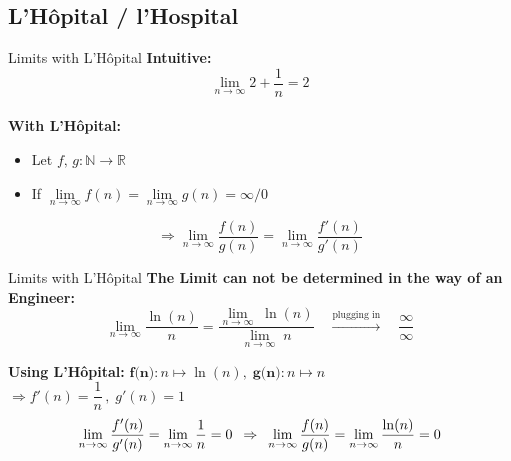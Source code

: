 \subsection{L'H\^{o}pital / l'Hospital}

\begin{frame}{Limits with L'H\^{o}pital}
  \textbf{Intuitive:}\\
  \[\lim\limits_{n \rightarrow \infty} 2 + \dfrac{1}{n} = 2\]
  \vspace*{1.0em}\\
  \textbf{With L'H\^{o}pital:}
  \begin{itemize}
    \item
      Let $f, \, g : \mathbb{N} \rightarrow \mathbb{R}$
    \item
      If
      $\lim\limits_{n \to \infty} f(n)
        = \lim\limits_{n \to \infty} g(n)
        = \infty / 0$
  \end{itemize}
  \[
    \Rightarrow \lim\limits_{n \rightarrow \infty} \dfrac{f(n)}{g(n)} = 
    \lim\limits_{n \rightarrow \infty} \dfrac{f'(n)}{g'(n)}
  \]
\end{frame}


\begin{frame}{Limits with L'H\^{o}pital}
  \textbf{The Limit can not be determined in the way of an Engineer:}\\
  \[
    \lim_{n \to \infty} \dfrac{\ln (n)}{n}
      = \dfrac{\lim_{n \to \infty}\; \ln (n)}{\lim\limits_{n \to \infty}\; n}
    \hspace{1em} \stackrel{\text{plugging in}}{\longrightarrow} \hspace{1em}
      \dfrac{\infty}{\infty}
  \]
  \begin{block}{\textbf{Using L'H\^{o}pital:}}
    $\textbf{f(n)}\!: n \mapsto \ln (n), \; \textbf{g(n)}\!: n \mapsto n$\\
    \hspace{1.5em}
    $\Rightarrow f'(n) = \dfrac{1}{n} \, , \; g'(n) = 1$
    \[
      \lim\limits_{n \rightarrow \infty} \dfrac{f'(n)}{g'(n)}
        = \lim\limits_{n \rightarrow \infty} \dfrac{1}{n} = 0
      \hspace{0.5em} \Rightarrow \hspace{0.5em}
      \lim\limits_{n \rightarrow \infty} \dfrac{f(n)}{g(n)}
        = \lim\limits_{n \rightarrow \infty} \dfrac{\ln (n)}{n} = 0
    \]
  \end{block}
\end{frame}

